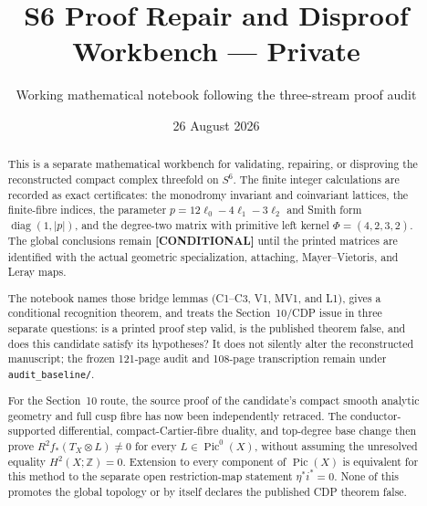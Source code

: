\documentclass[11pt,letterpaper]{article}
\title{S6 Proof Repair and Disproof Workbench --- Private}
\author{Working mathematical notebook following the three-stream proof audit}
\date{26 August 2026}
\newcommand{\Status}[2]{\mbox{\textcolor{#1}{\small\textbf{[#2]}}}}
\newcommand{\Conditional}{\Status{Conditional}{CONDITIONAL}}
\newcommand{\Source}[1]{\textcolor{Provenance}{\nolinkurl{#1}}}
\theoremstyle{definition}
\theoremstyle{remark}
\begin{document}
\maketitle

\begin{abstract}
This is a separate mathematical workbench for validating, repairing, or
disproving the reconstructed compact complex threefold on $S^6$.  The finite
integer calculations are recorded as exact certificates: the monodromy
invariant and coinvariant lattices, the finite-fibre indices, the parameter
$p=12\ell_0-4\ell_1-3\ell_2$ and Smith form
$\operatorname{diag}(1,|p|)$, and the degree-two matrix with primitive
left kernel $\Phi=(4,2,3,2)$.  The global conclusions remain
\Conditional{} until the printed matrices are identified with the actual
geometric specialization, attaching, Mayer--Vietoris, and Leray maps.

The notebook names those bridge lemmas (C1--C3, V1, MV1, and L1), gives a
conditional recognition theorem, and treats the Section~10/CDP issue in
three separate questions: is a printed proof step valid, is the published
theorem false, and does this candidate satisfy its hypotheses?  It does not
silently alter the reconstructed manuscript; the frozen 121-page audit and
108-page transcription remain under \Source{audit_baseline/}.

For the Section~10 route, the source proof of the candidate's compact smooth
analytic geometry and full cusp fibre has now been independently retraced.
The conductor-supported differential, compact-Cartier-fibre duality, and
top-degree base change then prove
$R^2f_*(T_X\otimes L)\ne0$ for every
$L\in\operatorname{Pic}^0(X)$, without assuming the unresolved equality
$H^2(X;\mathbb Z)=0$.  Extension to every component of
$\operatorname{Pic}(X)$ is equivalent for this method to the separate open
restriction-map statement $\eta^*i^*=0$.  None of this promotes the global
topology or by itself declares the published CDP theorem false.
\end{abstract}

\tableofcontents











\end{document}
